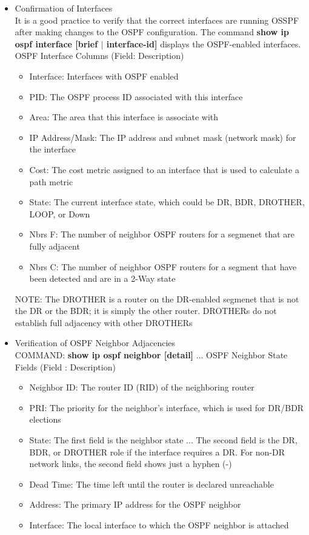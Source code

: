 \documentclass{article}
\begin{document}
\begin{itemize}
\begin{itemize}
			\item Confirmation of Interfaces\\
				It is a good practice to verify that the correct interfaces are running OSSPF after making changes to the OSPF configuration. The command \textbf{show ip ospf interface [brief $|$ interface-id]} displays the OSPF-enabled interfaces.
				OSPF Interface Columns (Field: Description)
					\begin{itemize}
						\item Interface: Interfaces with OSPF enabled
						\item PID: The OSPF process ID associated with this interface
						\item Area: The area that this interface is associate with
						\item IP Address/Mask: The IP address and subnet mask (network mask) for the interface
						\item Cost: The cost metric assigned to an interface that is used to calculate a path metric
						\item State: The current interface state, which could be DR, BDR, DROTHER, LOOP, or Down
						\item Nbrs F: The number of neighbor OSPF routers for a segmenet that are fully adjacent
						\item Nbrs C: The number of neighbor OSPF routers for a segment that have been detected and are in a 2-Way state
					\end{itemize}
				NOTE: The DROTHER is a router on the DR-enabled segmenet that is not the DR or the BDR; it is simply the other router. DROTHERs do not establish full adjacency with other DROTHERs

			\item Verification of OSPF Neighbor Adjacencies\\
				COMMAND: \textbf{show ip ospf neighbor [detail]} ... OSPF Neighbor State Fields (Field : Description)
				\begin{itemize}
					\item Neighbor ID: The router ID (RID) of the neighboring router
					\item PRI: The priority for the neighbor's interface, which is used for DR/BDR elections
					\item State: The first field is the neighbor state ... The second field is the DR, BDR, or DROTHER role if the interface requires a DR. For non-DR network links, the second field shows just a hyphen (-)
					\item Dead Time: The time left until the router is declared unreachable
					\item Address: The primary IP address for the OSPF neighbor
					\item Interface: The local interface to which the OSPF neighbor is attached
				\end{itemize}


\end{itemize}
\end{itemize}
\end{document}
